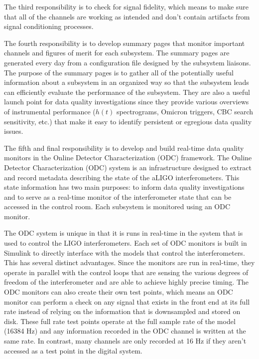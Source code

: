 The third responsibility 
is to check for signal fidelity, which means to make sure that all of the 
channels are working as intended and don't contain artifacts from signal 
conditioning processes.

The fourth responsibility is to develop summary pages that monitor 
important channels and figures of merit for each subsystem. 
The summary pages are generated 
every day from a configuration file designed by the subsystem liaisons. 
The purpose of the summary pages is to gather all of the potentially 
useful information about a subsystem in an organized way so that the 
subsystem leads can efficiently evaluate the performance of the subsystem. 
They are also a useful launch point for data quality 
investigations since they provide various overviews of instrumental 
performance ($h(t)$ spectrograms, Omicron triggers, CBC search sensitivity, etc.) 
that make it easy to identify persistent or egregious data quality issues.

The fifth and final responsibility is to develop and build real-time 
data quality monitors in the Online Detector Characterization (ODC) 
framework. 
The Online Detector Characterization (ODC) system is an infrastructure designed
to extract and record metadata describing the state of the aLIGO interferometers.
This state information has two main purposes: to inform data quality investigations
and to serve as a real-time monitor of the interferometer state
that can be accessed in the control room. Each subsystem is monitored 
using an ODC monitor.

The ODC system is unique in that it is runs in real-time in the 
system that is used to control the LIGO interferometers. Each set of ODC monitors
is built in Simulink to directly interface with the models that control the 
interferometers. This has several distinct advantages.
Since the monitors are run in real-time, they operate in parallel with the control
loops that are sensing the various degrees of freedom of the interferometer and are
able to achieve highly precise timing. The ODC monitors can also create their own
test points, which means an ODC monitor can perform a check on any signal that exists
in the front end at its full rate instead of relying on the information that is
downsampled and stored on disk.
These full rate test points operate at the full sample rate of the model (16384 Hz)
and any information recorded in the ODC channel is written at the same rate. In contrast,
many channels are only recorded at 16 Hz if they aren't accessed as a test point in the digital 
system.

